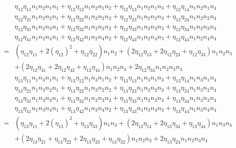\documentclass[12pt]{article}
\begin{document}
\begin{eqnarray}
&&\eta _{12}\eta _{11}n_{1}n_{2}n_{1}n_{1}+\eta _{12}\eta
_{12}n_{1}n_{2}n_{1}n_{2}+\eta _{12}\eta _{13}n_{1}n_{2}n_{1}n_{3}+\eta
_{12}\eta _{14}n_{1}n_{2}n_{1}n_{4} \\
&&\eta _{12}\eta _{21}n_{1}n_{2}n_{2}n_{1}+\eta _{12}\eta
_{22}n_{1}n_{2}n_{2}n_{2}+\eta _{12}\eta _{23}n_{1}n_{2}n_{2}n_{3}+\eta
_{12}\eta _{24}n_{1}n_{2}n_{2}n_{4} \\
&&\eta _{12}\eta _{31}n_{1}n_{2}n_{3}n_{1}+\eta _{12}\eta
_{32}n_{1}n_{2}n_{3}n_{2}+\eta _{12}\eta _{33}n_{1}n_{2}n_{3}n_{3}+\eta
_{12}\eta _{34}n_{1}n_{2}n_{3}n_{4} \\
&&\eta _{12}\eta _{41}n_{1}n_{2}n_{4}n_{1}+\eta _{12}\eta
_{42}n_{1}n_{2}n_{4}n_{2}+\eta _{12}\eta _{43}n_{1}n_{2}n_{4}n_{3}+\eta
_{12}\eta _{44}n_{1}n_{2}n_{4}n_{4} \\
&=&\left( \eta _{12}\eta _{11}+2\left( \eta _{12}\right) ^{2}+\eta _{12}\eta
_{22}\right) n_{1}n_{2}+\left( 2\eta _{12}\eta _{13}+2\eta _{12}\eta
_{23}+\eta _{12}\eta _{33}\right) n_{1}n_{2}n_{3} \\
&&+\left( 2\eta _{12}\eta _{41}+2\eta _{12}\eta _{42}+\eta _{12}\eta
_{44}\right) n_{1}n_{2}n_{4}+2\eta _{12}\eta _{34}n_{1}n_{2}n_{3}n_{4}
\end{eqnarray}%
\begin{eqnarray}
&&\eta _{13}\eta _{11}n_{1}n_{3}n_{1}n_{1}+\eta _{13}\eta
_{12}n_{1}n_{3}n_{1}n_{2}+\eta _{13}\eta _{13}n_{1}n_{3}n_{1}n_{3}+\eta
_{13}\eta _{14}n_{1}n_{3}n_{1}n_{4} \\
&&\eta _{13}\eta _{21}n_{1}n_{3}n_{2}n_{1}+\eta _{13}\eta
_{22}n_{1}n_{3}n_{2}n_{2}+\eta _{13}\eta _{23}n_{1}n_{3}n_{2}n_{3}+\eta
_{13}\eta _{24}n_{1}n_{3}n_{2}n_{4} \\
&&\eta _{13}\eta _{31}n_{1}n_{3}n_{3}n_{1}+\eta _{13}\eta
_{32}n_{1}n_{3}n_{3}n_{2}+\eta _{13}\eta _{33}n_{1}n_{3}n_{3}n_{3}+\eta
_{13}\eta _{34}n_{1}n_{3}n_{3}n_{4} \\
&&\eta _{13}\eta _{41}n_{1}n_{3}n_{4}n_{1}+\eta _{13}\eta
_{42}n_{1}n_{3}n_{4}n_{2}+\eta _{13}\eta _{43}n_{1}n_{3}n_{4}n_{3}+\eta
_{13}\eta _{44}n_{1}n_{3}n_{4}n_{4} \\
&=&\left( \eta _{13}\eta _{11}+2\left( \eta _{13}\right) ^{2}+\eta _{13}\eta
_{33}\right) n_{1}n_{3}+\left( 2\eta _{13}\eta _{14}+2\eta _{13}\eta
_{34}+\eta _{13}\eta _{44}\right) n_{1}n_{3}n_{4} \\
&&+\left( 2\eta _{13}\eta _{21}+\eta _{13}\eta _{22}+2\eta _{13}\eta
_{23}+\eta _{13}\eta _{32}\right) n_{1}n_{2}n_{3}+2\eta _{13}\eta
_{24}n_{1}n_{2}n_{3}n_{4}
\end{eqnarray}%
\end{document}

